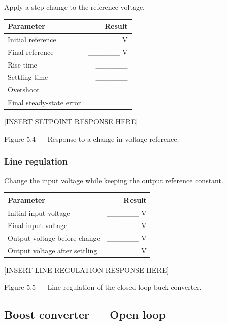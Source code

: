 \documentclass[
  paper=a4,
  oneside  ,captions=tableheading
]{scrartcl}
\newcounter{none}
\begin{document}
Apply a step change to the reference voltage.

{\def\LTcaptype{none} %
\begin{longtable}[]{@{}lr@{}}
\toprule\noalign{}
Parameter & Result \\
\midrule\noalign{}
\endhead
\bottomrule\noalign{}
\endlastfoot
Initial reference & \_\_\_\_\_\_ V \\
Final reference & \_\_\_\_\_\_ V \\
Rise time & \_\_\_\_\_\_ \\
Settling time & \_\_\_\_\_\_ \\
Overshoot & \_\_\_\_\_\_ \\
Final steady-state error & \_\_\_\_\_\_ \\
\end{longtable}
}

{[}INSERT SETPOINT RESPONSE HERE{]}

Figure 5.4 --- Response to a change in voltage reference.

\subsubsection{Line regulation}\label{line-regulation}

Change the input voltage while keeping the output reference constant.

{\def\LTcaptype{none} %
\begin{longtable}[]{@{}lr@{}}
\toprule\noalign{}
Parameter & Result \\
\midrule\noalign{}
\endhead
\bottomrule\noalign{}
\endlastfoot
Initial input voltage & \_\_\_\_\_\_ V \\
Final input voltage & \_\_\_\_\_\_ V \\
Output voltage before change & \_\_\_\_\_\_ V \\
Output voltage after settling & \_\_\_\_\_\_ V \\
\end{longtable}
}

{[}INSERT LINE REGULATION RESPONSE HERE{]}

Figure 5.5 --- Line regulation of the closed-loop buck converter.

\subsection{Boost converter --- Open
loop}\label{boost-converter-open-loop}
\end{document}
